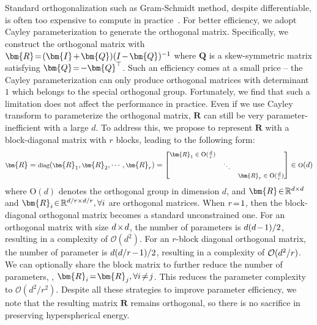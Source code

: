 Standard orthogonalization such as Gram-Schmidt method, despite differentiable, is often too expensive to compute in practice~\cite{liu2021orthogonal}. For better efficiency, we adopt Cayley parameterization to generate the orthogonal matrix. Specifically, we construct the orthogonal matrix with $\thickmuskip=2mu \medmuskip=2mu \bm{R}=(\bm{I}+\bm{Q})(I-\bm{Q})^{-1}$ where $\bm{Q}$ is a skew-symmetric matrix satisfying $\thickmuskip=2mu \medmuskip=2mu \bm{Q}=-\bm{Q}^\top$. Such an efficiency comes at a small price -- the Cayley parameterization can only produce orthogonal matrices with determinant $1$ which belongs to the special orthogonal group. Fortunately, we find that such a limitation does not affect the performance in practice. Even if we use Cayley transform to parameterize the orthogonal matrix, $\bm{R}$ can still be very parameter-inefficient with a large $d$. To address this, we propose to represent $\bm{R}$ with a block-diagonal matrix with $r$ blocks, leading to the following form:
\begin{equation}
    \footnotesize
    \bm{R}=\text{diag}(\bm{R}_1,\bm{R}_2,\cdots,\bm{R}_r)=\begin{bmatrix}
    \bm{R}_1\in \text{O}(\frac{d}{r}) &  &\\
    &\ddots & \\
    & & \bm{R}_r\in \text{O}(\frac{d}{r})
    \end{bmatrix}\in \text{O}(d)
\end{equation}
where $\text{O}(d)$ denotes the orthogonal group in dimension $d$, and $\thickmuskip=2mu \medmuskip=2mu \bm{R}\in\mathbb{R}^{d\times d}$ and $\thickmuskip=2mu \medmuskip=2mu \bm{R}_i\in\mathbb{R}^{d/r\times d/r},\forall i$ are orthogonal matrices. When $\thickmuskip=2mu \medmuskip=2mu r=1$, then the block-diagonal orthogonal matrix becomes a standard unconstrained one. For an orthogonal matrix with size $\thickmuskip=2mu \medmuskip=2mu d\times d$, the number of parameters is $\thickmuskip=2mu \medmuskip=2mu d(d-1)/2$, resulting in a complexity of $\mathcal{O}(d^2)$. For an $r$-block diagonal orthogonal matrix, the number of parameter is $\thickmuskip=2mu \medmuskip=2mu d(d/r-1)/2$, resulting in a complexity of $\thickmuskip=2mu \medmuskip=2mu \mathcal{O}(d^2/r)$. We can optionally share the block matrix to further reduce the number of parameters, \ie, $\thickmuskip=2mu \medmuskip=2mu\bm{R}_i=\bm{R}_j,\forall i\neq j$. This reduces the parameter complexity to $\mathcal{O}(d^2/r^2)$.  Despite all these strategies to improve parameter efficiency, we note that the resulting matrix $\bm{R}$ remains orthogonal, so there is no sacrifice in preserving hyperspherical energy.

